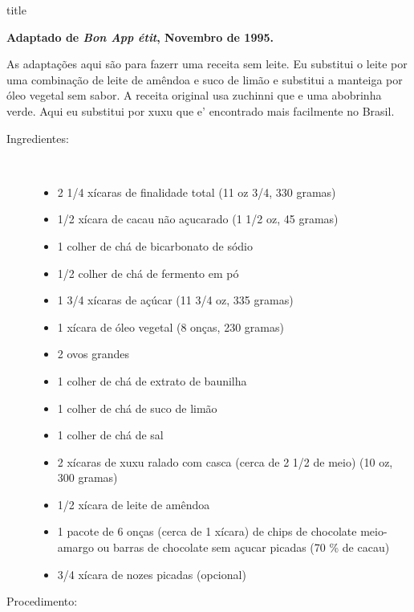 \documentclass [11pt, letterpaper] {article}
\begin{document}
 {title}


\begin {flushright}
{\bf Adaptado de {\it Bon App \'etit}, Novembro de 1995.}
\end {flushright}

As adaptações aqui são para fazerr uma receita sem leite. Eu substitui
o leite por uma combinação de leite de amêndoa e suco de limão e
substitui a manteiga por óleo vegetal sem sabor. A receita original
usa zuchinni que e uma abobrinha verde. Aqui eu substitui por xuxu que
e' encontrado mais facilmente no Brasil.

\begin {description}

\item [Ingredientes:] \ \\
\begin {itemize}
\item 2 1/4 xícaras de finalidade total (11 oz 3/4, 330 gramas)
\item 1/2 xícara de cacau não açucarado (1 1/2 oz, 45 gramas)
\item 1 colher de chá de bicarbonato de sódio
\item 1/2 colher de chá de fermento em pó
\item 1 3/4 xícaras de açúcar (11 3/4 oz, 335 gramas)
\item 1 xícara de óleo vegetal (8 onças, 230 gramas)
\item 2 ovos grandes
\item 1 colher de chá de extrato de baunilha
\item 1 colher de chá de suco de limão
\item 1 colher de chá de sal
\item 2 xícaras de xuxu ralado com casca (cerca de 2 1/2 de meio) (10 oz, 300 gramas)
\item 1/2 xícara de leite de amêndoa
\item 1 pacote de 6 onças (cerca de 1 xícara) de chips de chocolate
  meio-amargo ou barras de chocolate sem a\c{c}ucar picadas (70 \% de cacau)
\item 3/4 xícara de nozes picadas (opcional)
\end {itemize}

\item [Procedimento:] \ \\


\end{description}
\end{document}
